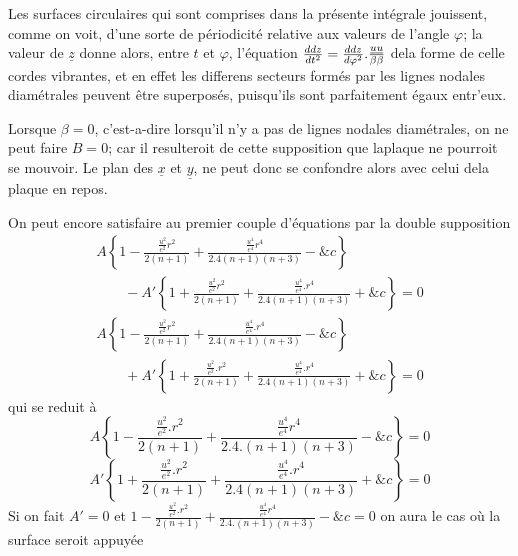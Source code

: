 \documentclass[11pt,a4paper]{article}
\begin{document}

Les surfaces circulaires qui sont comprises dans la présente intégrale
jouissent, comme on voit, d'une sorte de périodicité relative
aux valeurs de l'angle $\varphi$;   la valeur de $\underline{z}$
donne alors, entre $t$ et $\varphi$, l'équation $\frac{ddz}{dt^2} = \frac{ddz}{d\varphi^2}.\frac{\uncertain{uu}}{\beta\beta}$
dela forme de celle  cordes vibrantes, et en effet les
differens secteurs formés par les lignes nodales diamétrales
peuvent être superposés, puisqu'ils sont parfaitement égaux
entr'eux.

Lorsque $\beta = 0$, c'est-a-dire lorsqu'il n'y a pas de lignes
nodales diamétrales, on ne peut faire $B = 0$;  car il
resulteroit de cette supposition que laplaque ne pourroit
se mouvoir. Le plan des $\underline{x}$ et $\underline{y}$, ne peut donc se confondre
alors avec celui dela plaque en repos.

On peut encore satisfaire au premier couple d'équations
par la double supposition
\[ \begin{array}{l} A\left\{1 - \frac{\frac{u^2}{e^2}r^2}{2(n+1)} + \frac{\frac{u^4}{e^4}r^4}{2.4(n+1)(n+3)} - \&c\right\} \\ \qquad - A'\left\{1 + \frac{\frac{u^2}{e^2}r^2}{2(n+1)} + \frac{\frac{u^4}{e^4}.r^4}{2.4(n+1)(n+3)} + \&c\right\} = 0 \end{array} \]
\[ \begin{array}{l} A\left\{1 - \frac{\frac{u^2}{e^2}r^2}{2(n+1)} + \frac{\frac{u^4}{e^4}.r^4}{2.4(n+1)(n+3)} - \&c\right\} \\ \qquad + A'\left\{1 + \frac{\frac{u^2}{e^2}.r^2}{2(n+1)} + \frac{\frac{u^4}{e^4}.r^4}{2.4(n+1)(n+3)} + \&c\right\} = 0 \end{array} \]
qui se reduit à
\[ A\left\{1 - \frac{\frac{u^2}{e^2}.r^2}{2(n+1)} + \frac{\frac{u^4}{e^4}r^4}{2.4.(n+1)(n+3)} - \&c\right\} = 0 \]
\[ A'\left\{1 + \frac{\frac{u^2}{e^2}.r^2}{2(n+1)} + \frac{\frac{u^4}{e^4}.r^4}{2.4(n+1)(n+3)} + \&c\right\} = 0 \]
Si on fait $A' = 0$ et $1 - \frac{\frac{u^2}{e^2}.r^2}{2(n+1)} + \frac{\frac{u^4}{e^4}r^4}{2.4.(n+1)(n+3)} - \&c = 0$
on aura le cas où la surface seroit appuyée
\end{document}
